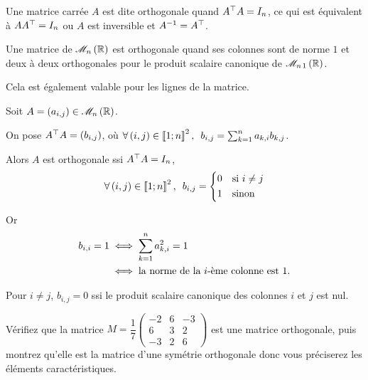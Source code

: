 \begin{defi}
Une matrice carrée \(A\) est dite orthogonale quand \(A^{\top}A=I_n\), ce qui est équivalent à \(AA^{\top}=I_n\) ou \(A\) est inversible et \(A^{-1}=A^{\top}\).
\end{defi}

\begin{prop}
Une matrice de \(\M{n}[\R]\) est orthogonale quand ses colonnes sont de norme \(1\) et deux à deux orthogonales pour le produit scalaire canonique de \(\M{n\,1}[\R]\).
\end{prop}

Cela est également valable pour les lignes de la matrice.

\begin{dem}
Soit \(A=\paren{a_{i,j}}\in\M{n}[\R]\).

On pose \(A^{\top}A=\left(b_{i,j}\right)\), où \(\quantifs{\forall\paren{i,j}\in\interventierii{1}{n}^2}b_{i,j}=\sum_{k=1}^na_{k,i}b_{k,j}\).

Alors \(A\) est orthogonale ssi \(A^{\top}A=I_n\), \ie \[\quantifs{\forall\paren{i,j}\in\interventierii{1}{n}^2}b_{i,j}=\begin{dcases}
0 &\text{si }i\not=j \\
1 &\text{sinon}
\end{dcases}\]

Or \[\begin{aligned}
b_{i,i}=1&\iff\sum_{k=1}^na_{k,i}^2=1 \\
&\iff\text{la norme de la }i\text{-ème colonne est }1.
\end{aligned}\]

Pour \(i\not=j\), \(b_{i,j}=0\) ssi le produit scalaire canonique des colonnes \(i\) et \(j\) est nul.
\end{dem}

\begin{exo}
Vérifiez que la matrice \(M=\dfrac{1}{7}\begin{pmatrix}
-2 & 6 & -3 \\
6 & 3 & 2 \\
-3 & 2 & 6
\end{pmatrix}\) est une matrice orthogonale, puis montrez qu'elle est la matrice d'une symétrie orthogonale donc vous préciserez les éléments caractéristiques.
\end{exo}

